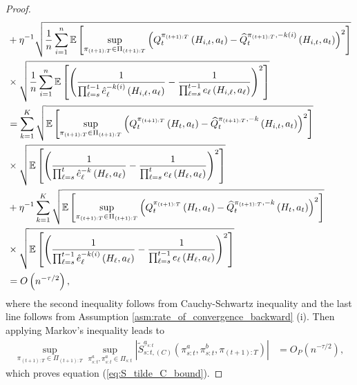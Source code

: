 \begin{proof}
\begin{align*}
&+ \eta^{-1}\sqrt{\frac{1}{n}\sum_{i=1}^{n}\mathbb{E}\left[\sup_{\pi_{(t+1):T}\in \Pi_{(t+1):T}}\left(Q_{t}^{\pi_{(t+1):T}}\left(H_{i,t},a_{t}\right)-\widehat{Q}_{t}^{\pi_{(t+1):T},-k(i)}\left(H_{i,t},a_{t}\right)\right)^{2}\right]} \\
&	\times\sqrt{\frac{1}{n}\sum_{i=1}^{n}\mathbb{E}\left[\left(\frac{1}{\prod_{\ell=s}^{t-1}\hat{e}_{\ell}^{-k(i)}\left(H_{i,\ell},a_{\ell}\right)}-\frac{1}{\prod_{\ell=s}^{t-1}e_{\ell}\left(H_{i,\ell},a_{\ell}\right)}\right)^{2}\right]} \\
&= \sum_{k=1}^{K}	\sqrt{\mathbb{E}\left[\sup_{\pi_{(t+1):T}\in \Pi_{(t+1):T}}\left(Q_{t}^{\pi_{(t+1):T}}\left(H_{t},a_{t}\right)-\widehat{Q}_{t}^{\pi_{(t+1):T},-k}\left(H_{i,t},a_{t}\right)\right)^{2}\right]} \\
&	\times\sqrt{\mathbb{E}\left[\left(\frac{1}{\prod_{\ell=s}^{t}\hat{e}_{\ell}^{-k}\left(H_{\ell},a_{\ell}\right)}-\frac{1}{\prod_{\ell=s}^{t}e_{\ell}\left(H_{\ell},a_{\ell}\right)}\right)^{2}\right]} \\
&+ \eta^{-1}\sum_{k=1}^{K}\sqrt{\mathbb{E}\left[\sup_{\pi_{(t+1):T}\in \Pi_{(t+1):T}}\left(Q_{t}^{\pi_{(t+1):T}}\left(H_{t},a_{t}\right)-\widehat{Q}_{t}^{\pi_{(t+1):T},-k}\left(H_{t},a_{t}\right)\right)^{2}\right]} \\
&	\times\sqrt{\mathbb{E}\left[\left(\frac{1}{\prod_{\ell=s}^{t-1}\hat{e}_{\ell}^{-k(i)}\left(H_{\ell},a_{\ell}\right)}-\frac{1}{\prod_{\ell=s}^{t-1}e_{\ell}\left(H_{\ell},a_{\ell}\right)}\right)^{2}\right]} \\
 &=	O\left(n^{-\tau/2}\right),
\end{align*}
where the second inequality follows from Cauchy-Schwartz inequality and the last line follows from Assumption \ref{asm:rate_of_convergence_backward} (i). Then applying Markov's inequality leads to
\begin{align}
   \sup_{\pi_{(t+1):T} \in \Pi_{(t+1):T}}\sup_{\pi_{s:t}^{a},\pi_{s:t}^{a}\in \Pi_{s:t}} \left| \widetilde{S}_{s:t,(C)}^{\underline{a}_{s:t}}(\pi_{s:t}^{a},\pi_{s:t}^{b},\pi_{(t+1):T})\right| &= O_{P}\left(n^{-\tau/2}\right), \label{eq:S_C_convergence}
\end{align}
which proves equation (\ref{eq:S_tilde_C_bound}).


\end{proof}
